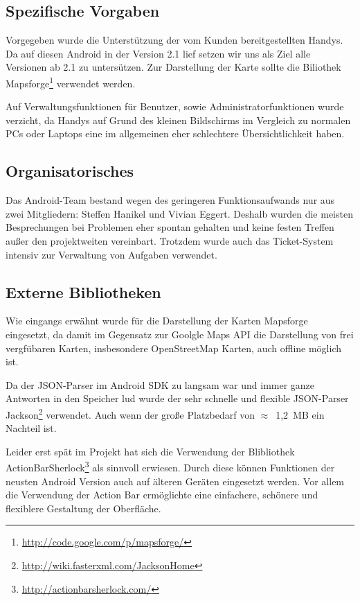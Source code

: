 \subsection*{Spezifische Vorgaben}
Vorgegeben wurde die Unterstützung der vom Kunden bereitgestellten Handys. Da auf diesen Android in der Version 2.1 lief setzen wir uns als Ziel alle Versionen ab 2.1 zu untersützen. Zur Darstellung der Karte sollte die Biliothek Mapsforge\footnote{\url{http://code.google.com/p/mapsforge/}} verwendet werden.

Auf Verwaltungsfunktionen für Benutzer, sowie Administratorfunktionen wurde verzicht, da Handys auf Grund des kleinen Bildschirms im Vergleich zu normalen PCs oder Laptops eine im allgemeinen eher schlechtere Übersichtlichkeit haben.

\subsection*{Organisatorisches}
Das Android-Team bestand wegen des geringeren Funktionsaufwands nur aus zwei Mitgliedern: Steffen Hanikel und Vivian Eggert. Deshalb wurden die meisten Besprechungen bei Problemen eher spontan gehalten und keine festen Treffen außer den projektweiten vereinbart. Trotzdem wurde auch das Ticket-System intensiv zur Verwaltung von Aufgaben verwendet.

\subsection*{Externe Bibliotheken}
Wie eingangs erwähnt wurde für die Darstellung der Karten Mapsforge eingesetzt, da damit im Gegensatz zur Goolgle Maps API die Darstellung von frei vergfübaren Karten, insbesondere OpenStreetMap Karten, auch offline möglich ist.

Da der JSON-Parser im Android SDK zu langsam war und immer ganze Antworten in den Speicher lud wurde der sehr schnelle und flexible JSON-Parser Jackson\footnote{\url{http://wiki.fasterxml.com/JacksonHome}} verwendet. Auch wenn der große Platzbedarf von $\approx$~1,2~MB ein Nachteil ist.

Leider erst spät im Projekt hat sich die Verwendung der Blibliothek ActionBarSherlock\footnote{\url{http://actionbarsherlock.com/}} als sinnvoll erwiesen. Durch diese können Funktionen der neusten Android Version auch auf älteren Geräten eingesetzt werden. Vor allem die Verwendung der Action Bar ermöglichte eine einfachere, schönere und flexiblere Gestaltung der Oberfläche.
	
